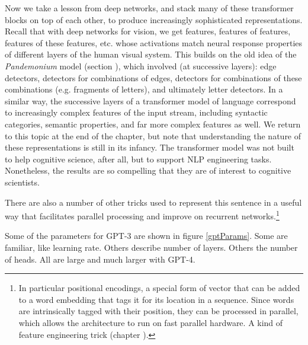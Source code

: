 Now we take a lesson from deep networks, and stack many of these transformer blocks on top of each other, to produce increasingly sophisticated representations.  Recall that with deep networks for vision, we get features, features of features, features of these features, etc. whose activations match neural response properties of different layers of the human visual system. This builds on the old idea of the \emph{Pandemonium} model (section ), which involved (at successive layers): edge detectors, detectors for combinations of edges, detectors for combinations of these combinations (e.g. fragments of letters), and ultimately letter detectors. In a similar way, the successive layers of a transformer model of language correspond to increasingly complex features of the input stream, including syntactic categories, semantic properties, and far more complex features as well. We return to this topic at the end of the chapter, but note that understanding the nature of these representations is still in its infancy. The transformer model was not built to help cognitive science, after all, but to support NLP engineering tasks. Nonetheless, the results are so compelling that they are of interest to cognitive scientists.

There are also a number of other tricks used to represent this sentence in a useful way that facilitates parallel processing and improve on recurrent networks.\footnote{In particular positional encodings, a special form of vector that can be added to a word embedding that tags it for its location in a sequence. Since words are intrinsically tagged with their position, they can be processed in parallel, which allows the architecture to run on fast parallel hardware. A kind of feature engineering trick (chapter ).  }

Some of the parameters for GPT-3 are shown in figure \ref{gptParams}. Some are familiar, like learning rate. Others describe number of layers. Others the number of heads. All are large and much larger with GPT-4.

